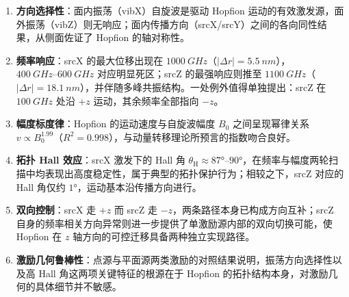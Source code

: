 \begin{enumerate}
  \item \textbf{方向选择性}：面内振荡（vibX）自旋波是驱动 Hopfion 运动的有效激发源，面外振荡（vibZ）则无响应；面内传播方向（srcX/srcY）之间的各向同性结果，从侧面佐证了 Hopfion 的轴对称性。
  \item \textbf{频率响应}：srcX 的最大位移出现在 $\SI{1000}{GHz}$（$|\Delta r| = \SI{5.5}{nm}$），$\SIrange{400}{600}{GHz}$ 对应明显死区；srcZ 的最强响应则推至 $\SI{1100}{GHz}$（$|\Delta r| = \SI{18.1}{nm}$），并伴随多峰共振结构。一处例外值得单独提出：srcZ 在 $\SI{100}{GHz}$ 处沿 $+z$ 运动，其余频率全部指向 $-z$。
  \item \textbf{幅度标度律}：Hopfion 的运动速度与自旋波幅度 $B_0$ 之间呈现幂律关系 $v \propto B_0^{1.99}$（$R^2 = 0.998$），与动量转移理论所预言的指数吻合良好。
  \item \textbf{拓扑 Hall 效应}：srcX 激发下的 Hall 角 $\theta_{\text{H}} \approx \ang{87}$--$\ang{90}$，在频率与幅度两轮扫描中均表现出高度稳定性，属于典型的拓扑保护行为；相较之下，srcZ 对应的 Hall 角仅约 $\ang{1}$，运动基本沿传播方向进行。
  \item \textbf{双向控制}：srcX 走 $+z$ 而 srcZ 走 $-z$，两条路径本身已构成方向互补；srcZ 自身的频率相关方向异常则进一步提供了单激励源内部的双向切换可能，使 Hopfion 在 $z$ 轴方向的可控迁移具备两种独立实现路径。
  \item \textbf{激励几何鲁棒性}：点源与平面源两类激励的对照结果说明，振荡方向选择性以及高 Hall 角这两项关键特征的根源在于 Hopfion 的拓扑结构本身，对激励几何的具体细节并不敏感。
\end{enumerate}
